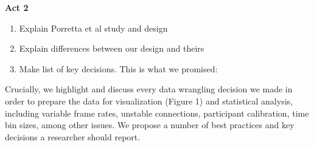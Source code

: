 \textbf{Act 2}
\begin{enumerate}
\item  Explain Porretta et al study and design
\item  Explain differences between our design and theirs
\item  Make list of key decisions. This is what we promised:
\end{enumerate}
\begin{itemize}
Crucially, we highlight and discuss every data wrangling decision we made in order to prepare the data for visualization (Figure 1) and statistical analysis, including variable frame rates, unstable connections, participant calibration, time bin sizes, among other issues. We propose a number of best practices and key decisions a researcher should report.
\end{itemize}

